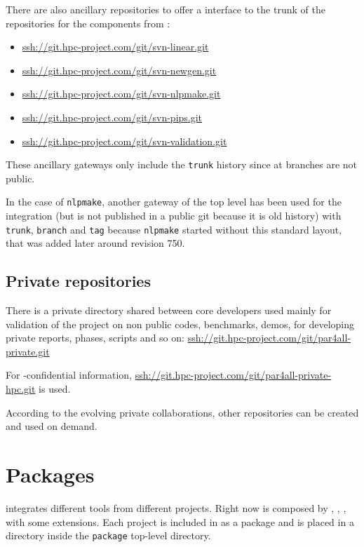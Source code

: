 \documentclass[a4paper]{article}
\begin{document}
There are also ancillary \Agit repositories to offer a \Agit interface to
the trunk of the \Asvn repositories for the \Apips components from
\Acri:
\begin{itemize}
\item \url{ssh://git.hpc-project.com/git/svn-linear.git}
\item \url{ssh://git.hpc-project.com/git/svn-newgen.git}
\item \url{ssh://git.hpc-project.com/git/svn-nlpmake.git}
\item \url{ssh://git.hpc-project.com/git/svn-pips.git}
\item \url{ssh://git.hpc-project.com/git/svn-validation.git}
\end{itemize}
These ancillary gateways only include the \texttt{trunk} history since at
\Acri branches are not public.

In the case of \texttt{nlpmake}, another \Agit{} \Asvn gateway of the top
level has been used for the integration (but is not published in a public
git because it is old history) with \texttt{trunk}, \texttt{branch} and
\texttt{tag} because \texttt{nlpmake} started without this standard
layout, that was added later around revision 750.


\subsection{Private repositories}
\label{sec:private-repositories}

There is a private directory shared between core developers used mainly
for validation of the project on non public codes, benchmarks, demos, for
developing private reports, phases, scripts and so on:
\url{ssh://git.hpc-project.com/git/par4all-private.git}

For \Ahpcp-confidential information,
\url{ssh://git.hpc-project.com/git/par4all-private-hpc.git} is used.

According to the evolving private collaborations, other repositories can
be created and used on demand.


\section{Packages}
\label{sec:packages}

\Apfa integrates different tools from different projects. Right now \Apfa
is composed by \Apips, \Apipsgfc, \Apolylib, with some extensions. Each
project is included in \Apfa as a package and is placed in a directory
inside the \texttt{package} top-level directory.
\end{document}
